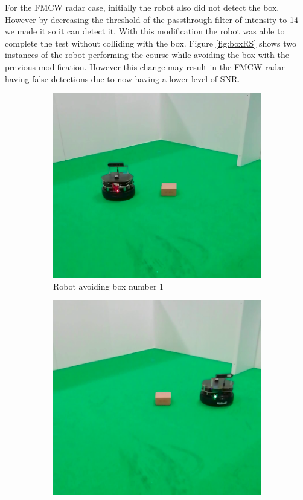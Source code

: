 For the \ac{FMCW} \ac{radar} case, initially the robot also did not detect the box. However by decreasing the threshold of the passthrough filter of intensity to 14 we made it so it can detect it. With this modification the robot was able to complete the test without colliding with the box. Figure \ref{fig:boxRS} shows two instances of the robot performing the course while avoiding the box with the previous modification. However this change may result in the \ac{FMCW} \ac{radar} having false detections due to now having a lower level of \ac{SNR}.

\begin{figure}[ht!]
  \centering
  \begin{subfigure}[b]{0.49\linewidth}
    \includegraphics[width=\linewidth]{imgs/chapter5/boxRS.png}
     \caption{Robot avoiding box number 1}
     \label{fig:boxRS1}
  \end{subfigure}
  \begin{subfigure}[b]{0.47\linewidth}
    \includegraphics[width=\linewidth]{imgs/chapter5/boxRS2.png}

\end{subfigure}
\end{figure}
